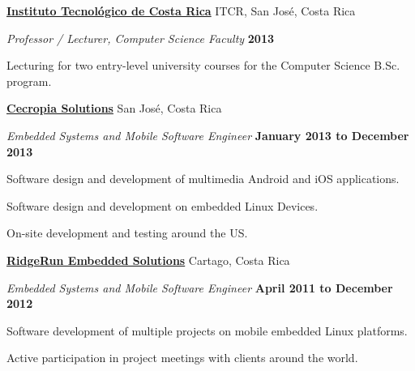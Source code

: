\documentclass[10pt]{article}
\newenvironment{outerlist}[1][\enskip\textbullet]%
        {\begin{itemize}[#1]}{\end{itemize}%
         \vspace{-0.9\baselineskip}}
\newenvironment{innerlist}[1][\enskip\textbullet]%
        {\begin{compactitem}[#1]}{\end{compactitem}}
\begin{document}
\href{http://www.tec.cr/}{\textbf{Instituto Tecnol\'{o}gico de Costa Rica}} ITCR,
San Jos\'{e}, Costa Rica
\begin{outerlist}

	\item[] \textit{Professor / Lecturer, Computer Science Faculty}%
		\hfill \textbf{2013} 
			\begin{innerlist}
			\item Lecturing for two entry-level university courses for the Computer Science B.Sc. program.\\
			\end{innerlist}

\end{outerlist}

\href{http://www.cecropiasolutions.com/}{\textbf{Cecropia Solutions}}
San Jos\'{e}, Costa Rica
\begin{outerlist}

	\item[] \textit{Embedded Systems and Mobile Software Engineer}%
		\hfill \textbf{January 2013 to December 2013} 
			\begin{innerlist}
			\item Software design and development of multimedia Android and iOS applications.
			\item Software design and development on embedded Linux Devices.
			\item On-site development and testing around the US.\\
			\end{innerlist}

\end{outerlist}
\href{http://www.ridgerun.com/}{\textbf{RidgeRun Embedded Solutions}}
Cartago, Costa Rica
\begin{outerlist}

	\item[] \textit{Embedded Systems and Mobile Software Engineer}%
		\hfill \textbf{April 2011 to December 2012} 
			\begin{innerlist}
			\item Software development of multiple projects on mobile embedded Linux platforms.
			\item Active participation in project meetings with clients around the world.\\
			\end{innerlist}

\end{outerlist}
\pagebreak
\end{document}
